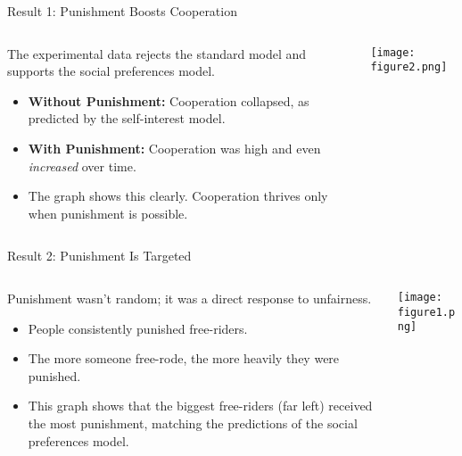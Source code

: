 \documentclass{beamer}
\begin{document}
\begin{frame}{Result 1: Punishment Boosts Cooperation}
    \begin{columns}[c]
        \begin{column}{.5\textwidth}
            The experimental data rejects the standard model and supports the social preferences model.
            \begin{itemize}
                \item<1-> \textbf{Without Punishment:} Cooperation collapsed, as predicted by the self-interest model.
                \pause
                \item<2-> \textbf{With Punishment:} Cooperation was high and even \textit{increased} over time.
                \pause
                \item<3-> The graph shows this clearly. Cooperation thrives only when punishment is possible.
            \end{itemize}
        \end{column}
        \begin{column}{.5\textwidth}
            \begin{center}
            \texttt{[image: figure2.png]}
            \end{center}
        \end{column}
    \end{columns}
\end{frame}

\begin{frame}{Result 2: Punishment Is Targeted}
    \begin{columns}[c]
        \begin{column}{.5\textwidth}
            Punishment wasn't random; it was a direct response to unfairness.
            \begin{itemize}
                \item<1-> People consistently punished free-riders.
                \pause
                \item<2-> The more someone free-rode, the more heavily they were punished.
                \pause
                \item<3-> This graph shows that the biggest free-riders (far left) received the most punishment, matching the predictions of the social preferences model.
            \end{itemize}
        \end{column}
        \begin{column}{.5\textwidth}
            \begin{center}
            \texttt{[image: figure1.png]}
            \end{center}
        \end{column}
    \end{columns}
\end{frame}
\end{document}

